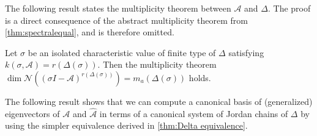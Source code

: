 \documentclass[english]{myarticle}
\begin{document}
\begin{sloppypar}
The following result states the multiplicity theorem between $\mathcal{A}$ and $\Delta$. The proof is a direct consequence of the abstract multiplicity theorem from \cref{thm:spectralequal}, and is therefore omitted.

\begin{corollary} \label{cor:multiplicity}
Let $\sigma$ be an isolated characteristic value of finite type of $\Delta$ satisfying $k(\sigma,\mathcal{A}) = r(\Delta(\sigma))$. Then the multiplicity theorem $\dim \mathcal{N}((\sigma I - \mathcal{A})^{r(\Delta(\sigma))}) =  m_a(\Delta(\sigma))$ holds.
\end{corollary}

The following result shows that we can compute a canonical basis of (generalized) eigenvectors of $\mathcal{A}$ and $\hat{\mathcal{A}}$ in terms of a canonical system of Jordan chains of $\Delta$ by using the simpler equivalence derived in \cref{thm:Delta equivalence}.


\end{sloppypar}
\end{document}
